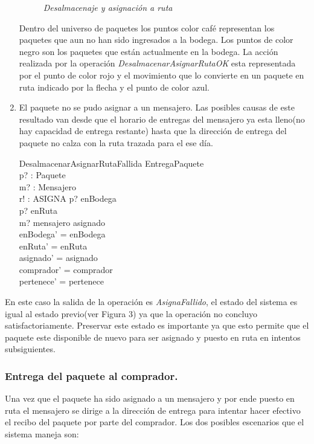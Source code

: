 \documentclass[12pt,a4paper]{article}
\begin{document}
\begin{enumerate}
\begin{figure}[H]
\caption{\textit{Desalmacenaje y asignación a ruta}} \label{fig:M1}
\end{figure}

Dentro del universo de paquetes los puntos color café representan los paquetes que aun no han sido ingresados a la bodega. Los puntos de color negro son los paquetes que están actualmente en la bodega. La acción realizada por la operación \textit{DesalmacenarAsignarRutaOK} esta representada por el punto de color rojo y el movimiento que lo convierte en un paquete en ruta indicado por la flecha y el punto de color azul.

\item El paquete no se pudo asignar a un mensajero. Las posibles causas de este resultado van desde que el horario de entregas del mensajero ya esta lleno(no hay capacidad de entrega restante) hasta que la dirección de entrega del paquete no calza con la ruta trazada para el ese día.

\begin{schema}{DesalmacenarAsignarRutaFallida}
\Xi EntregaPaquete\\
p? : Paquete\\
m? : Mensajero\\
r! : ASIGNA
\where
p? \in enBodega\\
p? \notin  enRuta\\
m? \in mensajero \setminus \ran asignado\\
enBodega' = enBodega\\
enRuta' = enRuta\\
asignado' = asignado\\
comprador' = comprador\\
pertenece' = pertenece
\end{schema}
\end{enumerate}

En este caso la salida de la operación es \textit{AsignaFallido}, el estado del sistema es igual al estado previo(ver Figura 3) ya que la operación no concluyo satisfactoriamente. Preservar este estado es importante ya que esto permite que el paquete este disponible de nuevo para ser asignado y puesto en ruta en intentos subsiguientes.

\newpage
\subsubsection{Entrega del paquete al comprador.}
Una vez que el paquete ha sido asignado a un mensajero y por ende puesto en ruta el mensajero se dirige a la dirección de entrega para intentar hacer efectivo el recibo del paquete por parte del comprador. Los dos posibles escenarios que el sistema maneja son:
\end{document}
